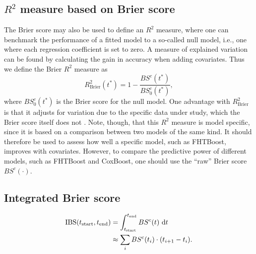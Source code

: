 \subsection{$R^2$ measure based on Brier score}
The Brier score may also be used to define an $R^2$ measure, where one can benchmark the performance of a fitted model to a so-called null model, i.e., one where each regression coefficient is set to zero. A measure of explained variation can be found by calculating the gain in accuracy when adding covariates. Thus we define the Brier $R^2$ measure as
\begin{equation*}
    R^2_{\text{Brier}}(t^*)=1-\frac{BS^c(t^*)}{BS^c_0(t^*)},
\end{equation*}
where $BS^c_0(t^*)$ is the Brier score for the null model.
One advantage with $R^2_{\text{Brier}}$ is that it adjusts for variation due to the specific data under study, which the Brier score itself does not \citep{bovelstadborgan}.
Note, though, that this $R^2$ measure is model specific, since it is based on a comparison between two models of the same kind.
It should therefore be used to assess how well a specific model, such as FHTBoost, improves with covariates.
However, to compare the predictive power of different models, such as FHTBoost and CoxBoost, one should use the ``raw'' Brier score $BS^c(\cdot)$.

\subsection{Integrated Brier score}
\begin{align*}
    \text{IBS}(t_{\text{start}}, t_{\text{end}})&=\int_{t_{\text{start}}}^{t_{\text{end}}}BS^c(t)~\text{d} t \\
    &\approx\sum_{i}BS^c(t_i)\cdot(t_{i+1}-t_{i}).
\end{align*}



